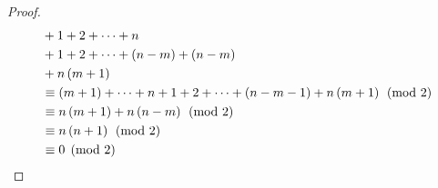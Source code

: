{\begin{proof}
\begin{align*}
                                & +1+2+\cdots+n                                                                            \\
                                & +1+2+\cdots+\left(n-m\right)+\left(n-m\right)
            \\
                                & +n\left(m+1\right)                                                                       \\
                                & \equiv \left(m+1\right)+\cdots+n+1+2+\cdots+\left(n-m-1\right)+n\left(m+1\right)\pmod{2} \\
                                & \equiv n\left(m+1\right)+
            n\left(n-m\right)
            \pmod{2}                                                                                                       \\
                                & \equiv n\left(n+1\right)\pmod{2}                                                         \\
                                & \equiv 0\pmod{2}\qedhere
        \end{align*}
    \end{proof}
}
